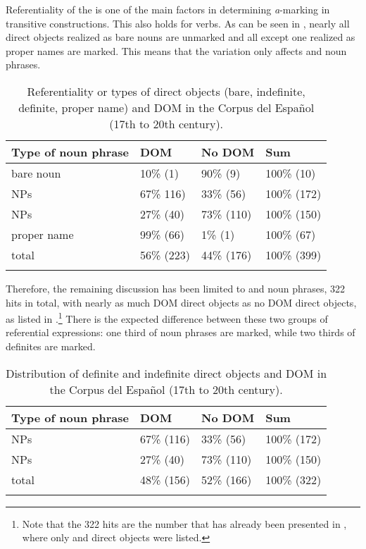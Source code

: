 \documentclass[output=paper]{LSP/langsci}
\begin{document}
Referentiality of the  is one of the main factors in determining \textit{a}-marking in transitive constructions. This also holds for  verbs. As can be seen in , nearly all direct objects realized as bare nouns are unmarked and all except one realized as proper names are marked. This means that the variation only affects  and  noun phrases.

\begin{table}
\caption{Referentiality or types of direct objects (bare, indefinite, definite, proper name) 
and DOM in the Corpus del Español (17th to 20th century).
}\label{11-he-tab:11}
\begin{tabularx}{\textwidth}{lQQQ}
\lsptoprule
Type of noun phrase &  DOM &  No DOM &  Sum\\
\midrule
bare noun &  10\% (1) &  90\% (9) &  100\% (10)\\
 NPs &  67\% 116) &  33\% (56) &  100\% (172)\\
 NPs &  27\% (40) &  73\% (110) &  100\% (150)\\
proper name &  99\% (66) &  1\% (1) &  100\% (67)\\
total &  56\% (223) &  44\% (176) &  100\% (399)\\
\lspbottomrule
\end{tabularx}
\end{table}

Therefore, the remaining discussion has been limited to  and  noun phrases, 322 hits in total, with nearly as much DOM direct objects as no DOM direct objects, as listed in .\footnote{Note that the 322 hits are the number that has already been presented in , where only  and  direct objects were listed.} There is the expected difference between these two groups of referential expressions: one third of  noun phrases are marked, while two thirds of definites are marked.

\begin{table}
\caption{Distribution of definite and indefinite direct objects and DOM in the Corpus del Español (17th to 20th century).}\label{11-he-tab:12}
\begin{tabularx}{\textwidth}{lQQQ}
\lsptoprule
Type of noun phrase &  DOM &  No DOM &  Sum\\
\midrule
{} NPs &  67\% (116) &  33\% (56) &  100\% (172)\\
 NPs &  27\% (40) &  73\% (110) &  100\% (150)\\
total &  48\% (156) &  52\% (166) &  100\% (322)\\
\lspbottomrule
\end{tabularx}
\end{table}
\end{document}
